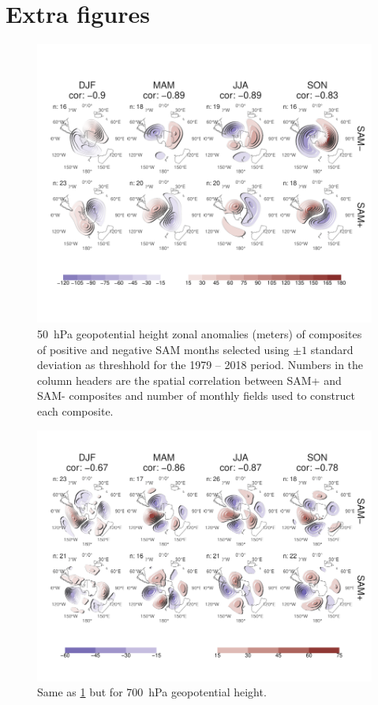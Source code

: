 \documentclass[smallextended]{svjour3}       %
\begin{document}
\newpage

\appendix


\hypertarget{extra-figures}{%
\section{Extra figures}\label{extra-figures}}

\newpage

\begin{figure}
\includegraphics{A3-1} \caption{50~hPa geopotential height zonal anomalies (meters) of composites of positive and negative SAM months selected using $\pm1$ standard deviation as threshhold for the 1979 -- 2018 period. Numbers in the column headers are the spatial correlation between SAM+ and SAM- composites and number of monthly fields used to construct each composite.}\label{fig:A3}
\end{figure}



\begin{figure}
\includegraphics{A4-1} \caption{Same as \ref{fig:A3} but for 700~hPa geopotential height.}\label{fig:A4}
\end{figure}
\end{document}
